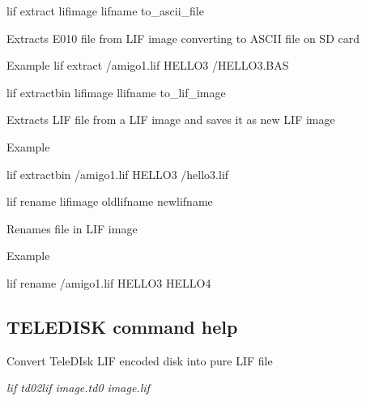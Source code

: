 \begin{DoxyItemize}
\item lif extract lifimage lifname to\+\_\+ascii\+\_\+file
\begin{DoxyItemize}
\item Extracts E010 file from L\+IF image converting to A\+S\+C\+II file on SD card
\item Example lif extract /amigo1.lif H\+E\+L\+L\+O3 /\+H\+E\+L\+L\+O3.B\+AS
\end{DoxyItemize}
\item lif extractbin lifimage llifname to\+\_\+lif\+\_\+image
\begin{DoxyItemize}
\item Extracts L\+IF file from a L\+IF image and saves it as new L\+IF image
\item Example
\begin{DoxyItemize}
\item lif extractbin /amigo1.lif H\+E\+L\+L\+O3 /hello3.lif
\end{DoxyItemize}
\end{DoxyItemize}
\item lif rename lifimage oldlifname newlifname
\begin{DoxyItemize}
\item Renames file in L\+IF image
\item Example
\begin{DoxyItemize}
\item lif rename /amigo1.lif H\+E\+L\+L\+O3 H\+E\+L\+L\+O4 

 \subsection*{T\+E\+L\+E\+D\+I\+SK command help}
\end{DoxyItemize}
\end{DoxyItemize}
\end{DoxyItemize}

Convert Tele\+D\+Isk L\+IF encoded disk into pure L\+IF file
\begin{DoxyItemize}
\item {\itshape lif td02lif image.\+td0 image.\+lif} 

 
\end{DoxyItemize}